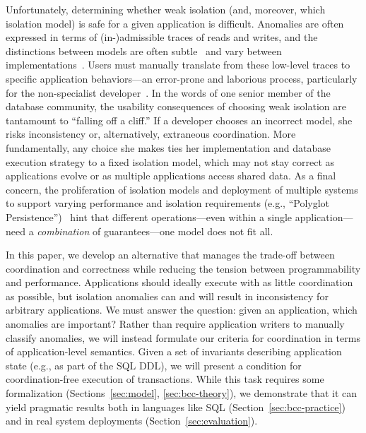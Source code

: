 Unfortunately, determining whether weak isolation (and, moreover,
which isolation model) is safe for a given application is
difficult. Anomalies are often expressed in terms of (in-)admissible
traces of reads and writes, and the distinctions between models are
often subtle~\cite{adya-isolation,isolation-semantics} and vary
between implementations~\cite{hat-vldb}. Users must manually translate
from these low-level traces to specific application behaviors---an
error-prone and laborious process, particularly for the non-specialist
developer~\cite{consistency-borders}. In the words of one senior
member of the database community, the usability consequences of
choosing weak isolation are tantamount to ``falling off a cliff.'' If
a developer chooses an incorrect model, she risks inconsistency or,
alternatively, extraneous coordination. More fundamentally, any choice
she makes ties her implementation and database execution strategy to a
fixed isolation model, which may not stay correct as applications
evolve or as multiple applications access shared data. As a final
concern, the proliferation of isolation models and deployment of
multiple systems to support varying performance and isolation
requirements (e.g., ``Polyglot Persistence'')~\cite{polyglot} hint
that different operations---even within a single application---need a
\textit{combination} of guarantees---one model does not fit all.



 In this paper, we develop
an alternative that manages the trade-off between coordination and
correctness while reducing the tension between programmability and
performance. Applications should ideally execute with as little
coordination as possible, but isolation anomalies can and will result
in inconsistency for arbitrary applications. We must answer the
question: given an application, which anomalies are important? Rather
than require application writers to manually classify anomalies, we
will instead formulate our criteria for coordination in terms of
application-level semantics. Given a set of invariants describing
application state (e.g., as part of the SQL DDL), we will present a
condition for coordination-free execution of transactions. While this
task requires some formalization
(Sections~\ref{sec:model}, \ref{sec:bcc-theory}), we demonstrate that
it can yield pragmatic results both in languages like SQL
(Section~\ref{sec:bcc-practice}) and in real system deployments
(Section~\ref{sec:evaluation}).



